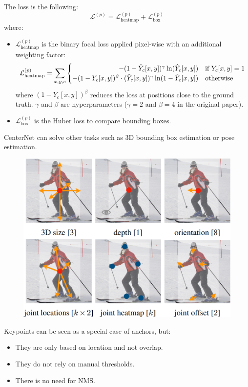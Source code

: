 \begin{description}
\begin{description}
                The loss is the following:
                \[ \mathcal{L}^{(p)} = \mathcal{L}_\text{heatmap}^{(p)} + \mathcal{L}_\text{box}^{(p)} \]
                where:
                \begin{itemize}
                    \item $\mathcal{L}_\text{heatmap}^{(p)}$ is the binary focal loss applied pixel-wise with an additional weighting factor:
                    \[ \mathcal{L}_\text{heatmap}^{(p)} = \sum_{x, y, c} \begin{cases}
                        \hfill -(1-\hat{Y}_c[x, y])^\gamma \ln(\hat{Y}_c[x, y]) & \text{if $Y_c[x, y] = 1$} \\
                        -(1-Y_c[x, y])^\beta \cdot (\hat{Y}_c[x, y])^\gamma \ln(1-\hat{Y}_c[x, y]) & \text{otherwise} \\
                    \end{cases} \]
                    where $(1-Y_c[x, y])^\beta$ reduces the loss at positions close to the ground truth. $\gamma$ and $\beta$ are hyperparameters ($\gamma=2$ and $\beta=4$ in the original paper).
                    \item $\mathcal{L}_\text{box}^{(p)}$ is the Huber loss to compare bounding boxes.
                \end{itemize}
        \end{description}

    \begin{remark}
        CenterNet can solve other tasks such as 3D bounding box estimation or pose estimation.

        \begin{figure}[H]
            \centering
            \includegraphics[width=0.55\linewidth]{./img/_centernet_other_tasks.png}
        \end{figure}
    \end{remark}

    \begin{remark}
        Keypoints can be seen as a special case of anchors, but:
        \begin{itemize}
            \item They are only based on location and not overlap.
            \item They do not rely on manual thresholds.
            \item There is no need for NMS.
        \end{itemize}


\end{remark}
\end{description}
